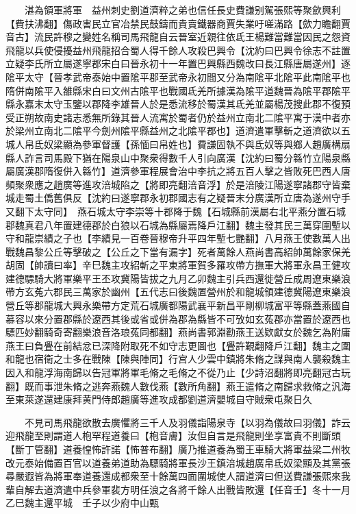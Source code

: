 　　湛為領軍將軍　益州刺史劉道濟粹之弟也信任長史費謙别駕張熙等聚歛興利【費扶沸翻】傷政害民立官冶禁民鼓鑄而貴賣鐵器商賈失業吁嗟滿路【歛力瞻翻賈音古】流民許穆之變姓名稱司馬飛龍自云晉室近親往依氐王楊難當難當因民之怨資飛龍以兵使侵擾益州飛龍招合蜀人得千餘人攻殺巴興令【沈約曰巴興令徐志不註置立疑李氏所立屬遂寧郡宋白曰晉永初十一年置巴興縣西魏改曰長江縣唐屬遂州】逐隂平太守【晉孝武帝泰始中置隂平郡至武帝永初間又分為南隂平北隂平此南隂平也隋併南隂平入雒縣宋白曰文州古隂平也戰國氐羌所據漢為隂平道魏晉為隂平郡隂平縣永嘉末太守玉鑒以郡降李雄晉人於是悉流移於蜀漢其氐羌並屬楊茂搜此郡不復預受正朔故南史諸志悉無所錄其晉人流寓於蜀者仍於益州立南北二隂平寓于漢中者亦於梁州立南北二隂平今劍州隂平縣益州之北隂平郡也】道濟遣軍擊斬之道濟欲以五城人帛氐奴梁顯為參軍督護【孫愐曰帛姓也】費謙固執不與氐奴等與鄉人趙廣構扇縣人詐言司馬殿下猶在陽泉山中聚衆得數千人引向廣漢【沈約曰蜀分緜竹立陽泉縣屬廣漢郡隋復併入緜竹】道濟參軍程展會治中李抗之將五百人擊之皆敗死巴西人唐頻聚衆應之趙廣等進攻涪城陷之【將即亮翻涪音浮】於是涪陵江陽遂寧諸郡守皆棄城走蜀土僑舊俱反【沈約曰遂寧郡永初郡國志有之疑晉末分廣漢所立唐為遂州守手又翻下太守同】　燕石城太守李崇等十郡降于魏【石城縣前漢屬右北平燕分置石城郡魏真君八年置建德郡於白狼以石城為縣屬焉降戶江翻】魏主發其民三萬穿圍塹以守和龍崇績之子也【李績見一百卷晉穆帝升平四年塹七艷翻】八月燕王使數萬人出戰魏昌黎公丘等擊破之【公丘之下當有漏字】死者萬餘人燕尚書高紹帥萬餘家保羌胡固【帥讀曰率】辛巳魏主攻紹斬之平東將軍賀多羅攻帶方撫軍大將軍永昌王健攻建德驃騎大將軍樂平王丕攻冀陽皆拔之九月乙卯魏主引兵西還徙營丘成周遼東樂浪帶方玄菟六郡民三萬家於幽州【五代志曰後魏置營州於和龍城領建德冀陽遼東樂浪營丘等郡龍城大興永樂帶方定荒石城廣都陽武襄平新昌平剛柳城富平等縣蓋燕國自慕容以來分置郡縣於遼西其後或省或併為郡為縣皆不可攷如玄菟郡亦當置於遼西也驃匹妙翻騎奇寄翻樂浪音洛琅菟同都翻】燕尚書郭淵勸燕王送欵獻女於魏乞為附庸燕王曰負舋在前結忿已深降附取死不如守志更圖也【舋許覲翻降戶江翻】魏主之圍和龍也宿衛之士多在戰陳【陳與陣同】行宫人少雲中鎮將朱脩之謀與南人襲殺魏主因入和龍浮海南歸以告冠軍將軍毛脩之毛脩之不從乃止【少詩沼翻將即亮翻冠古玩翻】既而事泄朱脩之逃奔燕魏人數伐燕【數所角翻】燕王遣脩之南歸求救脩之汎海至東萊遂還建康拜黄門侍郎趙廣等進攻成都劉道濟嬰城自守賊衆屯聚日久

　　不見司馬飛龍欲散去廣懼將三千人及羽儀詣陽泉寺【以羽為儀故曰羽儀】詐云迎飛龍至則謂道人枹罕程道養曰【枹音膚】汝但自言是飛龍則坐享富貴不則斷頭【斷丁管翻】道養惶怖許諾【怖普布翻】廣乃推道養為蜀王車騎大將軍益梁二州牧改元泰始備置百官以道養弟道助為驃騎將軍長沙王鎮涪城趙廣帛氐奴梁顯及其黨張尋嚴遐皆為將軍奉道養還成都衆至十餘萬四面圍城使人謂道濟曰但送費謙張熙來我輩自解去道濟遣中兵參軍裴方明任浪之各將千餘人出戰皆敗還【任音壬】冬十一月乙巳魏主還平城　壬子以少府中山甄

